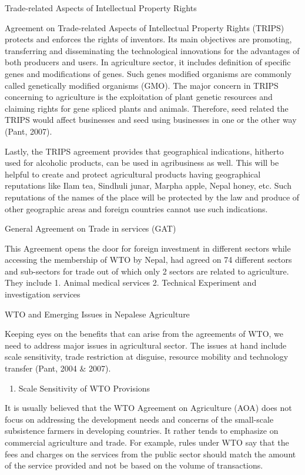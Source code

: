 \documentclass[
]{book}
\providecommand{\tightlist}{%
  \setlength{\itemsep}{0pt}\setlength{\parskip}{0pt}}
\begin{document}
Trade-related Aspects of Intellectual Property Rights

Agreement on Trade-related Aspects of Intellectual Property Rights (TRIPS) protects and enforces the rights of inventors. Its main objectives are promoting, transferring and disseminating the technological innovations for the advantages of both producers and users. In agriculture sector, it includes definition of specific genes and modifications of genes. Such genes modified organisms are commonly called genetically modified organisms (GMO). The major concern in TRIPS concerning to agriculture is the exploitation of plant genetic resources and claiming rights for gene spliced plants and animals. Therefore, seed related the TRIPS would affect businesses and seed using businesses in one or the other way (Pant, 2007).

Lastly, the TRIPS agreement provides that geographical indications, hitherto used for alcoholic products, can be used in agribusiness as well. This will be helpful to create and protect agricultural products having geographical reputations like Ilam tea, Sindhuli junar, Marpha apple, Nepal honey, etc. Such reputations of the names of the place will be protected by the law and produce of other geographic areas and foreign countries cannot use such indications.

General Agreement on Trade in services (GAT)

This Agreement opens the door for foreign investment in different sectors while accessing the membership of WTO by Nepal, had agreed on 74 different sectors and sub-sectors for trade out of which only 2 sectors are related to agriculture. They include
1. Animal medical services
2. Technical Experiment and investigation services

WTO and Emerging Issues in Nepalese Agriculture

Keeping eyes on the benefits that can arise from the agreements of WTO, we need to address major issues in agricultural sector. The issues at hand include scale sensitivity, trade restriction at disguise, resource mobility and technology transfer (Pant, 2004 \& 2007).

\begin{enumerate}
\def\labelenumi{\arabic{enumi}.}
\tightlist
\item
  Scale Sensitivity of WTO Provisions
\end{enumerate}

It is usually believed that the WTO Agreement on Agriculture (AOA) does not focus on addressing the development needs and concerns of the small-scale subsistence farmers in developing countries. It rather tends to emphasize on commercial agriculture and trade. For example, rules under WTO say that the fees and charges on the services from the public sector should match the amount of the service provided and not be based on the volume of transactions.
\end{document}
